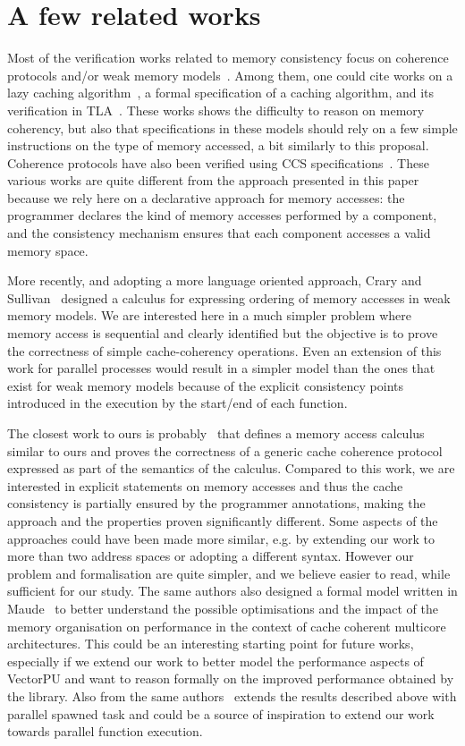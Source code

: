 \documentclass[preprint,12pt]{elsarticle}
\begin{document}
\section{A few related works}\label{sec:RW} 
Most of the verification works related to memory consistency focus on coherence 
protocols 
and/or 
weak memory models~\cite{pong1997verification}. 
Among them, one could cite works on a lazy caching algorithm~\cite{Gerth1999}, a formal specification of a caching 
algorithm, and its verification in TLA~\cite{Ladkin1999}. These works shows the 
difficulty to reason on memory coherency, but also that specifications in these models 
should rely on a few simple instructions on the type of memory accessed, a bit similarly 
to this proposal.
Coherence protocols have also been verified using CCS specifications~\cite{Barrio01}. 
These various works are quite different from the approach presented in this paper because 
we rely here on a declarative approach for memory accesses: the programmer declares the 
kind of memory accesses performed by a component, and the consistency mechanism ensures 
that each component accesses a valid memory space.

More recently, and adopting a more language oriented approach, Crary and 
Sullivan~\cite{Crary:POPL:2015} designed 
a calculus for expressing ordering of memory accesses in weak memory models. We 
are interested here in a much simpler problem where memory access is  sequential 
and clearly identified but the objective is to prove the correctness of simple cache-coherency operations. 
Even an  extension of this work for parallel processes would  result in a 
simpler model than the ones that exist for weak memory models because of the explicit 
consistency points introduced in the execution by the start/end of each function. 

The closest work to ours is probably~\cite{BJPTSAC16} that defines a memory access calculus similar to ours and proves the 
correctness of a generic cache coherence protocol expressed as part of the semantics of 
the calculus. Compared to this work, we are interested in explicit statements on memory 
accesses and thus the cache consistency is partially ensured  by the programmer 
annotations, making the approach and the properties proven significantly different. Some 
aspects of the approaches could have been made more similar, e.g. by extending our 
work to more than two address spaces or adopting a different  syntax. However our problem 
and formalisation are quite simpler, and we 
believe easier to read, while sufficient for our study.
The same authors also designed a formal model written in Maude~\cite{BJPTMaude16} to 
better understand the possible 
optimisations and the impact of the memory organisation on performance in the context of 
cache coherent multicore architectures. This could be an interesting starting point for 
future works, especially if we 
extend our work to better model the performance aspects of VectorPU and want to reason 
formally on the improved performance obtained by the library. Also from the same authors~\cite{Bijo2017} extends the results described above with parallel spawned task and could be a source of inspiration  to extend our work towards parallel function execution.
\end{document}
